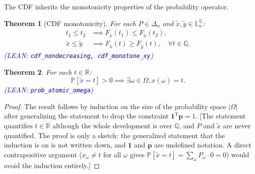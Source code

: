 \documentclass[letterpaper]{article}
\theoremstyle{plain}
\newtheorem{theorem}{Theorem}[subsection]
\theoremstyle{definition}
\theoremstyle{remark}
\newcommand{\Real}{\mathbb{R}}
\newcommand{\PP}{\mathbb{P}}
\newcommand{\tr}{^{\mathsf{T}}}
\newcommand{\cc}[1]{\textcolor{ccolor}{[#1]}}
\newcommand{\lean}[1]{\textcolor{blue}{(\emph{LEAN}: \texttt{#1})}}
\newcommand{\leanok}{}
\begin{document}
The CDF inherits the monotonicity properties of the probability operator.
\begin{theorem}[CDF monotonicity] \label{thm:cdf-monotone}
  For each $P\in \Delta_n$ and $\tilde{x}, \tilde{y} \in \mathbb{L}_n^{\mathbb{Q}}$:
  \begin{align*}
    t_1 \le t_2 &\implies F_{\tilde{x}}(t_1) \le F_{\tilde{x}}(t_2), \\
    \tilde{x} \le \tilde{y} &\implies F_{\tilde{x}}(t) \ge F_{\tilde{y}}(t), \quad \forall t\in \mathbb{Q}.
  \end{align*}
  \lean{cdf\_nondecreasing, cdf\_monotone\_xy} \leanok
\end{theorem}

\begin{theorem} \label{lem:prob-lumpy}
  For each $t\in \Real$:
  \[
    \PP[\tilde{x} = t] > 0
    \implies
    \exists \omega \in \Omega, x(\omega) = t.
  \]
  \lean{prob\_atomic\_omega} \leanok
\end{theorem}
\begin{proof}
  The result follows by induction on the size of the probability space $|\Omega|$ after generalizing the statement to drop the constraint $\bm{1}\tr \bm{p} = 1$.
  \cc{The statement quantifies $t\in \Real$ although the whole development is over $\mathbb{Q}$, and $P$ and $\tilde{x}$ are never quantified. The proof is only a sketch: the generalized statement that the induction is on is not written down, and $\bm{1}$ and $\bm{p}$ are undefined notation. A direct contrapositive argument ($x_{\omega}\ne t$ for all $\omega$ gives $\PP[\tilde{x}=t]=\sum_{\omega} P_{\omega}\cdot 0 = 0$) would avoid the induction entirely.}
\end{proof}
\end{document}
